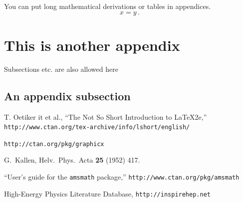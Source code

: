 \documentclass[a4paper,12pt]{article}
\begin{document}
You can put long mathematical derivations or tables in appendices.
\begin{equation}
\label{appendixequation}
x = y\,.
\end{equation}

\section{This is another appendix}
\setcounter{equation}{0}

Subsections etc. are also allowed here

\subsection{An appendix subsection}


\begin{thebibliography}{99}
T. Oetiker {it et al.}, ``The Not So Short Introduction to \LaTeX2e,''
{\tt http://www.ctan.org/tex-archive/info/lshort/english/}

{\tt http://ctan.org/pkg/graphicx}

G.~Kallen,
Helv.\ Phys.\ Acta {\bf 25} (1952) 417.

``User's guide for the {\tt amsmath} package,''
{\tt http://www.ctan.org/pkg/amsmath}

 High-Energy Physics Literature Database,
{\tt http://inspirehep.net}

\end{thebibliography}
\end{document}
